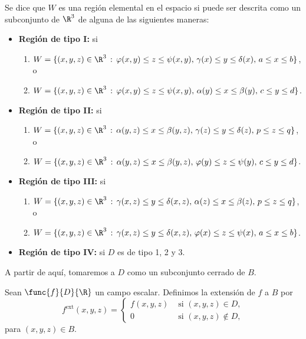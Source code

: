 \documentclass[a4,11pt]{aleph-notas}
\begin{document}
\begin{defi}
    Se dice que $W$ es una región elemental en el espacio si puede ser descrita como un subconjunto de $\R^3$ de alguna de las siguientes maneras:
    \begin{itemize}
        \item \textbf{Región de tipo I:} si
        \begin{enumerate}[label=(\alph*)]
            \item $W=\{(x,y,z)\in\R^3 \, : \, \varphi(x,y) \leq z \leq \psi(x,y), \, \gamma(x)\leq y \leq \delta(x),\, a\leq x\leq b \}$, o
            \item $W=\{(x,y,z)\in\R^3 \, : \, \varphi(x,y) \leq z \leq \psi(x,y), \, \alpha(y)\leq x \leq \beta(y),\, c\leq y\leq d \}$.
        \end{enumerate}
        
        \item \textbf{Región de tipo II:} si
        \begin{enumerate}[label=(\alph*)]
            \item $W=\{(x,y,z)\in\R^3 \, : \, \alpha(y,z) \leq x \leq \beta(y,z), \, \gamma(z)\leq y \leq \delta(z),\, p\leq z\leq q \}$, o
            \item $W=\{(x,y,z)\in\R^3 \, : \, \alpha(y,z) \leq x \leq \beta(y,z), \, \varphi(y)\leq z \leq \psi(y),\, c\leq y\leq d \}$.
        \end{enumerate}
        
        \item \textbf{Región de tipo III:} si
        \begin{enumerate}[label=(\alph*)]
            \item $W=\{(x,y,z)\in\R^3 \, : \, \gamma(x,z) \leq y \leq \delta(x,z), \, \alpha(z)\leq x \leq \beta(z),\, p\leq z\leq q \}$, o
            \item $W=\{(x,y,z)\in\R^3 \, : \, \gamma(x,z) \leq y \leq \delta(x,z), \, \varphi(x)\leq z \leq \psi(x),\, a\leq x\leq b \}$.
        \end{enumerate}
        
        \item \textbf{Región de tipo IV:} si $D$ es de tipo 1, 2 y 3.
    \end{itemize}
\end{defi}
   
A partir de aquí, tomaremos a $D$ como un subconjunto cerrado de $B$.

\begin{defi}
    Sean $\func{f}{D}{\R}$ un campo escalar. Definimos la extensión de $f$ a $B$ por
    \[
        f^{\text{ext}}(x,y,z) = \begin{cases}
                          f(x,y,z) & \text{ si } (x,y,z)\in D, \\
                          0 & \text{ si } (x,y,z) \not\in D,
                         \end{cases}
    \]
    para $(x,y,z)\in B$.
\end{defi}
\end{document}
